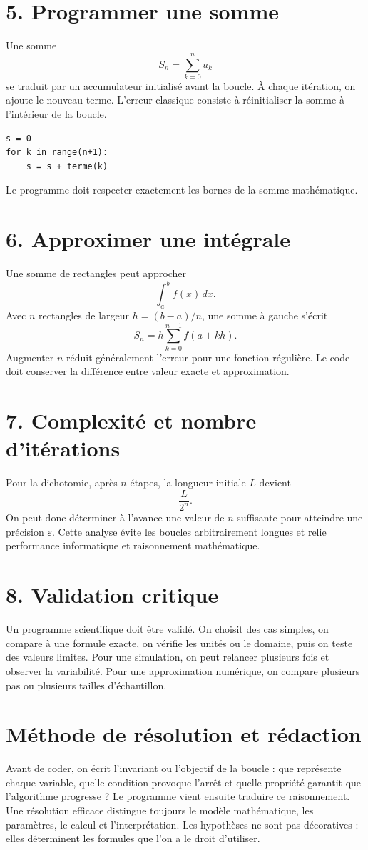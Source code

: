 \section{5. Programmer une somme}
Une somme
\[
S_n=\sum_{k=0}^{n}u_k
\]
se traduit par un accumulateur initialisé avant la boucle. À chaque itération, on ajoute le nouveau terme. L’erreur classique consiste à réinitialiser la somme à l’intérieur de la boucle.

\begin{verbatim}
s = 0
for k in range(n+1):
    s = s + terme(k)
\end{verbatim}

Le programme doit respecter exactement les bornes de la somme mathématique.

\section{6. Approximer une intégrale}
Une somme de rectangles peut approcher
\[
\int_a^b f(x)\,dx.
\]
Avec $n$ rectangles de largeur $h=(b-a)/n$, une somme à gauche s’écrit
\[
S_n=h\sum_{k=0}^{n-1}f(a+kh).
\]
Augmenter $n$ réduit généralement l’erreur pour une fonction régulière. Le code doit conserver la différence entre valeur exacte et approximation.

\section{7. Complexité et nombre d’itérations}
Pour la dichotomie, après $n$ étapes, la longueur initiale $L$ devient
\[
\frac{L}{2^n}.
\]
On peut donc déterminer à l’avance une valeur de $n$ suffisante pour atteindre une précision $\varepsilon$. Cette analyse évite les boucles arbitrairement longues et relie performance informatique et raisonnement mathématique.

\section{8. Validation critique}
Un programme scientifique doit être validé. On choisit des cas simples, on compare à une formule exacte, on vérifie les unités ou le domaine, puis on teste des valeurs limites. Pour une simulation, on peut relancer plusieurs fois et observer la variabilité. Pour une approximation numérique, on compare plusieurs pas ou plusieurs tailles d’échantillon.

\section{Méthode de résolution et rédaction}
Avant de coder, on écrit l’invariant ou l’objectif de la boucle : que représente chaque variable, quelle condition provoque l’arrêt et quelle propriété garantit que l’algorithme progresse ? Le programme vient ensuite traduire ce raisonnement.
Une résolution efficace distingue toujours le modèle mathématique, les paramètres, le calcul et l’interprétation. Les hypothèses ne sont pas décoratives : elles déterminent les formules que l’on a le droit d’utiliser.


